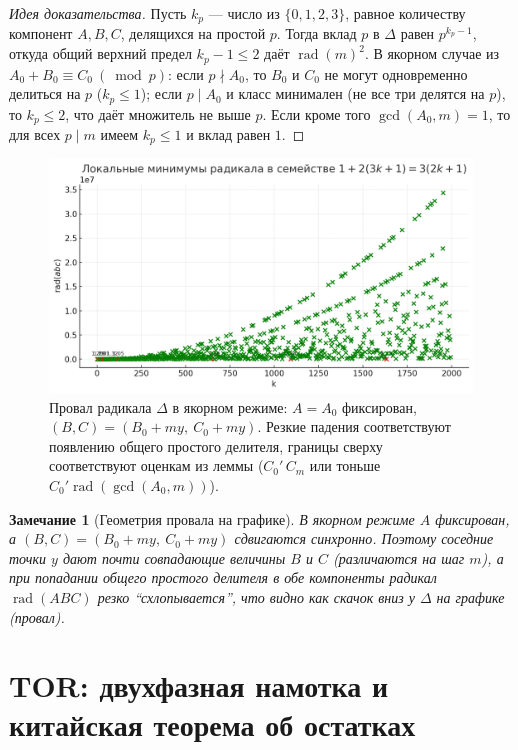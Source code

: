 \documentclass[11pt,a4paper]{article}
\newtheorem{remark}[definition]{Замечание}
\newcommand{\rad}{\operatorname{rad}}
\begin{document}
\begin{proof}[Идея доказательства]
Пусть $k_p$ — число из $\{0,1,2,3\}$, равное количеству компонент $A,B,C$, делящихся на простой $p$.
Тогда вклад $p$ в $\Delta$ равен $p^{k_p-1}$, откуда общий верхний предел $k_p-1\le2$ даёт $\rad(m)^2$.
В якорном случае из $A_0+B_0\equiv C_0\ (\bmod p)$:
если $p\nmid A_0$, то $B_0$ и $C_0$ не могут одновременно делиться на $p$ ($k_p\le1$);
если $p\mid A_0$ и класс минимален (не все три делятся на $p$), то $k_p\le2$, что даёт множитель не выше $p$.
Если кроме того $\gcd(A_0,m)=1$, то для всех $p\mid m$ имеем $k_p\le1$ и вклад равен $1$.
\end{proof}
\begin{figure}[H]
  \centering
  \includegraphics[width=0.92\linewidth]{rad-fall-graph.png} %
  \caption{Провал радикала \(\Delta\) в якорном режиме: $A=A_0$ фиксирован, 
  $(B,C)=(B_0+my,\ C_0+my)$. Резкие падения соответствуют появлению общего простого делителя,
  границы сверху соответствуют оценкам из леммы (\(C_0'\,C_m\) или тоньше \(C_0'\rad(\gcd(A_0,m))\)).}
  \label{fig:rad-fall-graph}
\end{figure}
\begin{remark}[Геометрия провала на графике]
В якорном режиме $A$ фиксирован, а $(B,C)=(B_0+my,\ C_0+my)$ сдвигаются синхронно.
Поэтому соседние точки $y$ дают почти совпадающие величины $B$ и $C$ (различаются на шаг $m$),
а при попадании общего простого делителя в обе компоненты радикал $\rad(ABC)$ резко ``схлопывается'',
что видно как скачок вниз у $\Delta$ на графике (\emph{провал}).
\end{remark}

\section{TOR: двухфазная намотка и китайская теорема об остатках}
\end{document}
